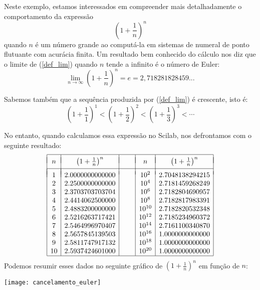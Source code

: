 \begin{ex} Neste exemplo, estamos interessados em compreender mais detalhadamente o comportamento da expressão
\begin{equation}\label{def_lim}\left(1+\frac{1}{n}\right)^n\end{equation}
quando $n$ é um número grande ao computá-la em sistemas de numeral de ponto flutuante com acurácia finita.
Um resultado bem conhecido do cálculo nos diz que o limite de (\ref{def_lim}) quando $n$ tende a infinito é o número de Euler:
\begin{equation}\label{lim}\lim_{n\to \infty}\left(1+\frac{1}{n}\right)^n=e= 2,718281828459...\end{equation}

Sabemos também que a sequência produzida por (\ref{def_lim}) é crescente, isto é:
$$\left(1+\frac{1}{1}\right)^1< \left(1+\frac{1}{2}\right)^2< \left(1+\frac{1}{3}\right)^3 < \cdots $$

No entanto, quando calculamos essa expressão no Scilab, nos defrontamos com o seguinte resultado:
$$\begin{array}{|c|c|c|c|c|}
\hline &&&&\\[-0.3cm]
n & \left(1+\frac{1}{n}\right)^n&~~~~&n & \left(1+\frac{1}{n}\right)^n\\
 &&&&\\[-0.3cm]
\hline\\[-0.3cm]
1 & 2.0000000000000 && 10^{2} & 2.7048138294215 \\
2 & 2.2500000000000 && 10^{4} & 2.7181459268249 \\
3 & 2.3703703703704 && 10^{6} & 2.7182804690957 \\
4 & 2.4414062500000 && 10^{8} & 2.7182817983391 \\
5 & 2.4883200000000 && 10^{10} & 2.7182820532348 \\
6 & 2.5216263717421 && 10^{12} & 2.7185234960372 \\
7 & 2.5464996970407 && 10^{14} & 2.7161100340870 \\
8 & 2.5657845139503 && 10^{16} & 1.0000000000000 \\
9 & 2.5811747917132 && 10^{18} & 1.0000000000000 \\
10 & 2.5937424601000 && 10^{20} & 1.0000000000000 \\
\hline
\end{array}
$$
Podemos resumir esses dados no seguinte gráfico de $\left(1+\frac{1}{n}\right)^n$ em função de $n$:

\texttt{[image: cancelamento\_euler]}


\end{ex}
